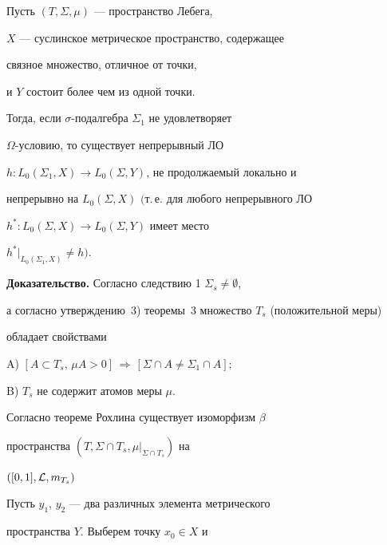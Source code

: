 \begin{thm}


Пусть $(T,\Sigma,\mu)$ --- пространство Лебега,


$X$ --- суслинское метрическое пространство, содержащее


связное множество, отличное от точки,


и $Y$ состоит более чем из одной точки.





Тогда, если $\sigma$-подалгебра $\Sigma_1$ не удовлетворяет


$\Omega$-ус\-ло\-вию, то существует непрерывный ЛО


$h:L_0(\Sigma_1,X)\to L_0(\Sigma,Y)$, не продолжаемый локально и


непрерывно на $L_0(\Sigma,X)$ $($т.\,е. для любого непрерывного ЛО


$h^\ast:L_0(\Sigma,X)\to L_0(\Sigma,Y)$ имеет место


$h^\ast|_{L_0(\Sigma_1,X)}\ne h)$.


\end{thm}





{\bf Доказательство.} Согласно следствию 1\; $\Sigma_s\ne\emptyset$,


а согласно утверждению~3) теоремы~3 множество $T_s$ (положительной меры)


обладает свойствами





A) $[A\subset T_s,\,\mu A>0]\,\Rightarrow\,


[\Sigma\cap A\ne\Sigma_1\cap A];$





B) $T_s$ не содержит атомов меры $\mu$.





Согласно теореме Рохлина существует изоморфизм $\beta$


пространства $(T,\Sigma\cap T_s,\mu|_{\Sigma\cap T_s})$ на


$([0,1],{\cal L},m_{T_s})$





Пусть $y_1$, $y_2$ --- два различных элемента метрического


пространства $Y$. Выберем точку $x_0\in X$ и


